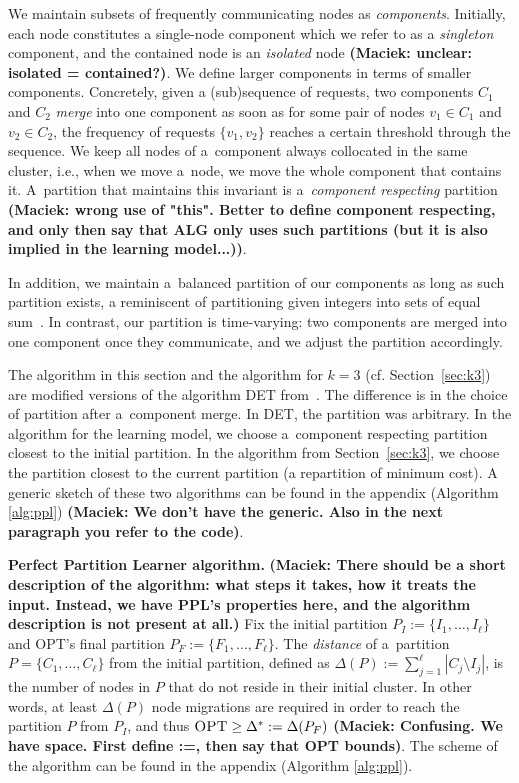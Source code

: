 \documentclass[a4paper,anonymous,USenglish]{lipics-v2019}
\newcommand{\OPT}{\textsc{OPT}\xspace}
\newcommand\maciek[1]{\color{brown}\textbf{(Maciek: #1)}\color{black}}
\begin{document}
We maintain subsets of frequently communicating nodes as \emph{components}.
Initially,
each node constitutes a single-node component which we refer to as a \emph{singleton} component, 
and the contained node is an \emph{isolated} node \maciek{unclear: isolated = contained?}.
We define larger components in terms of smaller components.
Concretely,
given a (sub)sequence of requests,
two components $C_1$ and $C_2$
 \emph{merge} into one component as soon as
 for some pair of nodes $v_1 \in C_1$ and $v_2 \in C_2$,
the frequency of requests $\{v_1,v_2\}$ reaches a certain threshold through the sequence.
We keep all nodes of a~component always collocated in the same cluster,
i.e., when we  move a~node,
we move the whole component that contains it.
A~partition that maintains this invariant is a~\emph{component respecting} partition \maciek{wrong use of "this". Better to define component respecting, and only then say that ALG only uses such partitions (but it is also implied in the learning model...)}.

In addition,
we maintain a~balanced partition of our components as long as such partition exists,
a reminiscent of partitioning given integers into sets of equal sum~\cite{integer-partitions-book}.
In contrast, our partition is time-varying:  two components are merged into one component once they communicate, and we adjust the partition accordingly.


\medskip

The algorithm in this section and the algorithm for $k=3$ (cf. Section~\ref{sec:k3}) are modified versions of the algorithm DET from~\cite{repartition-disc}.
The difference is in the choice of partition after a~component merge.
In DET, the partition was arbitrary.
In the algorithm for the learning model,
we choose a~component respecting partition closest to the initial partition.
In the algorithm from Section~\ref{sec:k3}, we choose the partition closest to the current partition (a repartition of minimum cost).
A generic sketch of these two algorithms can be found in the appendix (Algorithm \ref{alg:ppl}) \maciek{We don't have the generic. Also in the next paragraph you refer to the code}.

\noindent
\textbf{Perfect Partition Learner algorithm.}
\maciek{There should be a short description of the algorithm: what steps it takes, how it treats the input. Instead, we have PPL's properties here, and the algorithm description is not present at all.}
Fix the initial partition
$P_I :=\{ I_1, \dots, I_{\ell}\}$ and \OPT's final partition
$P_F := \{F_1, \dots, F_{\ell}\}$.
The \emph{distance} of a~partition
 $P = \{C_1, \dots, C_{\ell}\}$ from the initial partition,
defined as 
$\Delta(P) := \sum_{j=1}^{\ell} | C_j \setminus I_j |$,
 is the number of nodes in $P$ that do not reside in their initial cluster.
In other words,
at least $\Delta(P)$ node migrations are required in order to reach the partition $P$ from $P_I$, and thus
$\OPT \geq \Delta^*:= \Delta(P_F) $ \maciek{Confusing. We have space. First define :=, then say that OPT bounds}.
The scheme of the algorithm can be found in the  appendix (Algorithm \ref{alg:ppl}).
\end{document}
